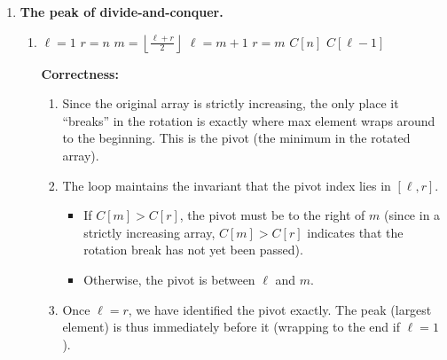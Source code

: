 \documentclass{article}
\begin{document}
\begin{enumerate}
\begin{enumerate}
    \end{enumerate}
    \pagebreak
    \item \textbf{The peak of divide-and-conquer.} \\
    \begin{enumerate}
        \item \begin{algorithm}
            \begin{algorithmic}[1]
                    \State $\ell = 1$
                    \State $r = n$
                        \State $m = \left\lfloor \frac{\ell + r}{2} \right\rfloor$
                            \State $\ell = m + 1$
                        \Else
                            \State $r = m$
                        \EndIf
                    \EndWhile
                        \State \Return $C[n]$
                    \Else
                        \State \Return $C[\ell - 1]$
                    \EndIf
                \EndFunction
            \end{algorithmic}
            \end{algorithm}
            \textbf{Correctness:}
            \begin{enumerate}
                \item Since the original array is strictly increasing, the only place it ``breaks'' in the rotation is exactly where max element wraps around to the beginning. This is the pivot (the minimum in the rotated array).
                \item The loop maintains the invariant that the pivot index lies in $[\ell, r]$. 
                    \begin{itemize}
                        \item If $C[m] > C[r]$, the pivot must be to the right of $m$ (since in a strictly increasing array, $C[m] > C[r]$ indicates that the rotation break has not yet been passed).
                        \item Otherwise, the pivot is between $\ell$ and $m$. 
                    \end{itemize}
                \item Once $\ell = r$, we have identified the pivot exactly. The peak (largest element) is thus immediately before it (wrapping to the end if $\ell=1$).
            \end{enumerate}


\end{enumerate}
\end{enumerate}
\end{document}
